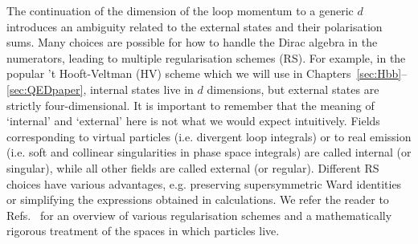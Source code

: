 \documentclass[main.tex]{subfiles}
\begin{document}
The continuation of the dimension of the loop momentum to a generic $d$ introduces an ambiguity related to the external states and their polarisation sums. Many choices are possible for how to handle the Dirac algebra in the numerators, leading to multiple regularisation schemes (RS). For example, in the popular 't Hooft-Veltman (HV) scheme which we will use in Chapters~\ref{sec:Hbb}--\ref{sec:QEDpaper}, internal states live in $d$ dimensions, but external states are strictly four-dimensional. It is important to remember that the meaning of `internal' and `external' here is not what we would expect intuitively. Fields corresponding to virtual particles (i.e. divergent loop integrals) or to real emission (i.e. soft and collinear singularities in phase space integrals) are called internal (or singular), while all other fields are called external (or regular). Different RS choices have various advantages, e.g. preserving supersymmetric Ward identities or simplifying the expressions obtained in calculations. We refer the reader to Refs.~\cite{Signer:2008va, Gnendiger:2017pys} for an overview of various regularisation schemes and a mathematically rigorous treatment of the spaces in which particles live.

%
\end{document}
